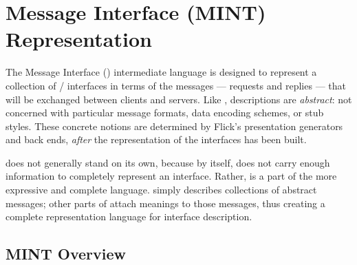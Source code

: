 

\chapter{Message Interface (MINT) Representation}
\label{cha:MINT}

The Message Interface (\MINT{}) intermediate language is designed to represent
a collection of \RPC{}/\RMI{} interfaces in terms of the messages --- requests
and replies --- that will be exchanged between clients and servers.  Like
\AOI{}, \MINT{} descriptions are \emph{abstract}: not concerned with particular
message formats, data encoding schemes, or stub styles.  These concrete notions
are determined by Flick's presentation generators and back ends, \emph{after}
the \MINT{} representation of the interfaces has been built.

\MINT{} does not generally stand on its own, because by itself, \MINT{} does
not carry enough information to completely represent an interface.  Rather,
\MINT{} is a part of the more expressive and complete \PRESC{} language.
\MINT{} simply describes collections of abstract messages; other parts of
\PRESC{} attach meanings to those messages, thus creating a complete
representation language for interface description.



\section{MINT Overview}
\label{sec:MINT:MINT Overview}

